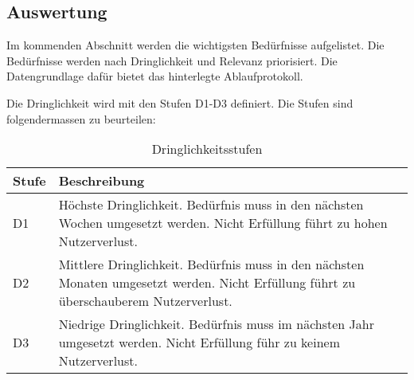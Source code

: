 \newpage

\subsection{Auswertung}
Im kommenden Abschnitt werden die wichtigsten Bedürfnisse aufgelistet. Die Bedürfnisse werden
nach Dringlichkeit und Relevanz priorisiert. Die Datengrundlage dafür bietet das hinterlegte Ablaufprotokoll.

Die Dringlichkeit wird mit den Stufen D1-D3 definiert. Die Stufen sind folgendermassen zu beurteilen:
\begin{table}[h!]
   \begin{tabular}{|L{0.2\textwidth}|L{0.7\textwidth}|}
       \hline
       \color{white}Stufe & \color{white} Beschreibung \\
       \hline
       D1 & Höchste Dringlichkeit. Bedürfnis muss in den nächsten Wochen umgesetzt werden. Nicht Erfüllung führt zu hohen Nutzerverlust. \\
      \hline
       D2 & Mittlere Dringlichkeit. Bedürfnis muss in den nächsten Monaten umgesetzt werden. Nicht Erfüllung führt zu überschauberem Nutzerverlust. \\
      \hline
       D3 & Niedrige Dringlichkeit. Bedürfnis muss im nächsten Jahr umgesetzt werden. Nicht Erfüllung führ zu keinem Nutzerverlust. \\
     \hline
     \end{tabular}
     \caption{Dringlichkeitsstufen}
\end{table}

\newpage

